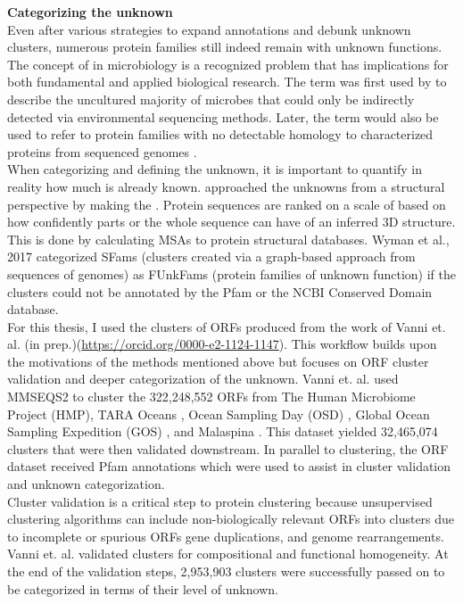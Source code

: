 \textbf{Categorizing the unknown}\\

Even after various strategies to expand annotations and debunk unknown clusters, numerous protein families still indeed remain with unknown functions. The concept of  in microbiology is a recognized problem that has implications for both fundamental and applied biological research. The term  was first used by \cite{Marcy_2007} to describe the uncultured majority of microbes that could only be indirectly detected via environmental sequencing methods. Later, the term would also be used to refer to protein families with no detectable homology to characterized proteins from sequenced genomes \citep{Ellens_2017, Perdig_o_2017, Roux_2015, Fischer_1999}.\\

When categorizing and defining the unknown, it is important to quantify in reality how much is already known. \cite{Perdig_o_2017} approached the unknowns from a structural perspective by making the . Protein sequences are ranked on a scale of  based on how confidently parts or the whole sequence can have of an inferred 3D structure. This is done by calculating MSAs to protein structural databases. Wyman et al., 2017 categorized SFams (clusters created via a graph-based approach from sequences of genomes) as FUnkFams (protein families of unknown function) if the clusters could not be annotated by the Pfam or the NCBI Conserved Domain database.\\

For this thesis, I used the clusters of ORFs produced from the work of Vanni et. al. (in prep.)(\url{https://orcid.org/0000-e2-1124-1147}). This workflow builds upon the motivations of the methods mentioned above but focuses on ORF cluster validation and deeper categorization of the unknown. Vanni et. al. used MMSEQS2 to cluster the 322,248,552 ORFs from The Human Microbiome Project (HMP), TARA Oceans \citep{Sunagawa_2015}, Ocean Sampling Day (OSD) \citep{Kopf_2015}, Global Ocean Sampling Expedition (GOS) \citep{Yooseph_2007}, and Malaspina \citep{Duarte_2015}. This dataset yielded 32,465,074 clusters that were then validated downstream. In parallel to clustering, the ORF dataset received Pfam annotations which were used to assist in cluster validation and unknown categorization.\\

Cluster validation is a critical step to protein clustering because unsupervised clustering algorithms can include non-biologically relevant ORFs into clusters due to incomplete or spurious ORFs gene duplications, and genome rearrangements. Vanni et. al. validated clusters for compositional and functional homogeneity. At the end of the validation steps, 2,953,903 clusters were successfully passed on to be categorized in terms of their level of unknown.\\


